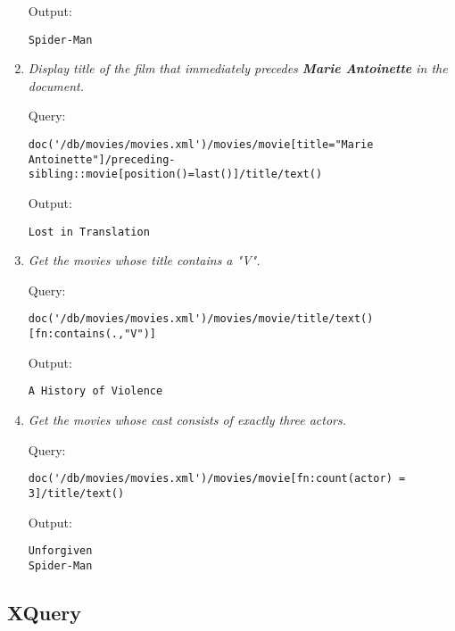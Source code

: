 \documentclass[a4paper, notitlepage]{article}
\begin{document}
\begin{enumerate}
Output:
  
\begin{lstlisting}
Spider-Man
\end{lstlisting} 

\item 
  \emph{Display title of the film that immediately precedes \textbf{Marie Antoinette} in the document.} 
  
Query: 
  
\begin{lstlisting}
doc('/db/movies/movies.xml')/movies/movie[title="Marie Antoinette"]/preceding-sibling::movie[position()=last()]/title/text()
\end{lstlisting}
  
Output:
  
\begin{lstlisting}
Lost in Translation
\end{lstlisting}   

\item 
  \emph{Get the movies whose title contains a "V".} 
  
Query: 
  
\begin{lstlisting}
doc('/db/movies/movies.xml')/movies/movie/title/text()[fn:contains(.,"V")]
\end{lstlisting}
  
Output:
  
\begin{lstlisting}
A History of Violence
\end{lstlisting}   

\item 
  \emph{Get the movies whose cast consists of exactly three actors.} 
  
Query: 
  
\begin{lstlisting}
doc('/db/movies/movies.xml')/movies/movie[fn:count(actor) = 3]/title/text()
\end{lstlisting}
  
Output:
  
\begin{lstlisting}
Unforgiven
Spider-Man
\end{lstlisting}   
  
\end{enumerate}


\subsection{XQuery}
\end{document}
